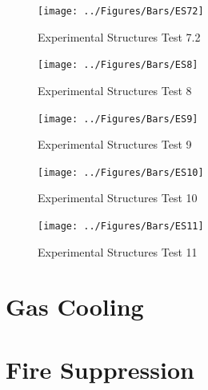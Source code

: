 \documentclass[12pt,oneside]{book}
\begin{document}
\begin{figure}[!ht]
	\texttt{[image: ../Figures/Bars/ES72]}
	\caption{Experimental Structures Test 7.2}
	\label{fig:Experimental_Structures_Test_7.2}
\end{figure}

\clearpage

\begin{figure}[!ht]
	\texttt{[image: ../Figures/Bars/ES8]}
	\caption{Experimental Structures Test 8}
	\label{fig:Experimental_Structures_Test_8}
\end{figure}

\begin{figure}[!ht]
	\texttt{[image: ../Figures/Bars/ES9]}
	\caption{Experimental Structures Test 9}
	\label{fig:Experimental_Structures_Test_9}
\end{figure}

\begin{figure}[!ht]
	\texttt{[image: ../Figures/Bars/ES10]}
	\caption{Experimental Structures Test 10}
	\label{fig:Experimental_Structures_Test_10}
\end{figure}

\begin{figure}[!ht]
	\texttt{[image: ../Figures/Bars/ES11]}
	\caption{Experimental Structures Test 11}
	\label{fig:Experimental_Structures_Test_11}
\end{figure}

\clearpage

\section{Gas Cooling}
\label{sec:Gas_Cooling}

\section{Fire Suppression}
\label{sec:Fire_Suppression}	
\end{document}

